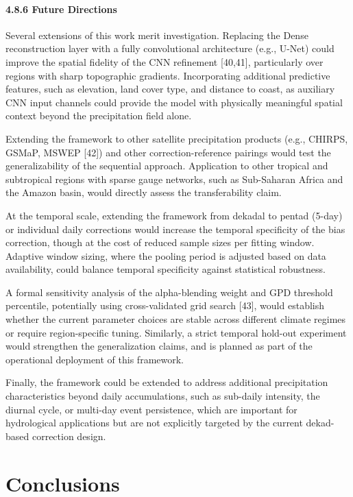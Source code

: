 \documentclass[
]{article}
\begin{document}
\paragraph{4.8.6 Future Directions}\label{future-directions}

Several extensions of this work merit investigation. Replacing the Dense
reconstruction layer with a fully convolutional architecture (e.g.,
U-Net) could improve the spatial fidelity of the CNN refinement
{[}40,41{]}, particularly over regions with sharp topographic gradients.
Incorporating additional predictive features, such as elevation, land
cover type, and distance to coast, as auxiliary CNN input channels could
provide the model with physically meaningful spatial context beyond the
precipitation field alone.

Extending the framework to other satellite precipitation products (e.g.,
CHIRPS, GSMaP, MSWEP {[}42{]}) and other correction-reference pairings
would test the generalizability of the sequential approach. Application
to other tropical and subtropical regions with sparse gauge networks,
such as Sub-Saharan Africa and the Amazon basin, would directly assess
the transferability claim.

At the temporal scale, extending the framework from dekadal to pentad
(5-day) or individual daily corrections would increase the temporal
specificity of the bias correction, though at the cost of reduced sample
sizes per fitting window. Adaptive window sizing, where the pooling
period is adjusted based on data availability, could balance temporal
specificity against statistical robustness.

A formal sensitivity analysis of the alpha-blending weight and GPD
threshold percentile, potentially using cross-validated grid search
{[}43{]}, would establish whether the current parameter choices are
stable across different climate regimes or require region-specific
tuning. Similarly, a strict temporal hold-out experiment would
strengthen the generalization claims, and is planned as part of the
operational deployment of this framework.

Finally, the framework could be extended to address additional
precipitation characteristics beyond daily accumulations, such as
sub-daily intensity, the diurnal cycle, or multi-day event persistence,
which are important for hydrological applications but are not explicitly
targeted by the current dekad-based correction design.

\section{Conclusions}\label{conclusions}
\end{document}
